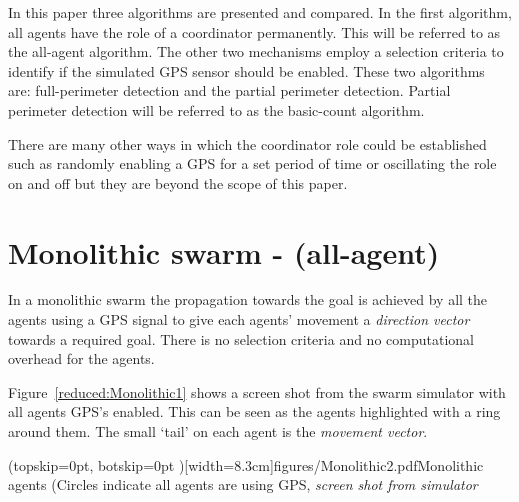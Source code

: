 \documentclass{ieeeaccess}
\begin{document}
In this paper three algorithms are presented and compared. In the first algorithm, all agents have the role of a coordinator permanently. This will be referred to as the all-agent algorithm. The other two mechanisms employ a selection criteria to identify if the simulated GPS sensor should be enabled. These two algorithms are: full-perimeter detection and the partial perimeter detection. Partial perimeter detection will be referred to as the basic-count algorithm.

There are many other ways in which the coordinator role could be established such as randomly enabling a GPS for a set period of time or oscillating the role on and off but they are beyond the scope of this paper.

\section{Monolithic swarm - (all-agent)} 
In a monolithic swarm \cite{BS:13} the propagation towards the goal is achieved by all the agents using a GPS signal to give each agents' movement a \textit{direction vector} towards a required goal. There is no selection criteria and no computational overhead for the agents.

Figure~\ref{reduced:Monolithic1} shows a screen shot from the swarm simulator with all agents GPS's enabled. This can be seen as the agents highlighted with a ring around them. The small `tail' on each agent is the \textit{movement vector}.


\Figure[t!](topskip=0pt, botskip=0pt )[width=8.3cm]{figures/Monolithic2.pdf}{Monolithic agents (Circles indicate all agents are using GPS, \textit{screen shot from simulator}\label{reduced:Monolithic1}}
\end{document}
